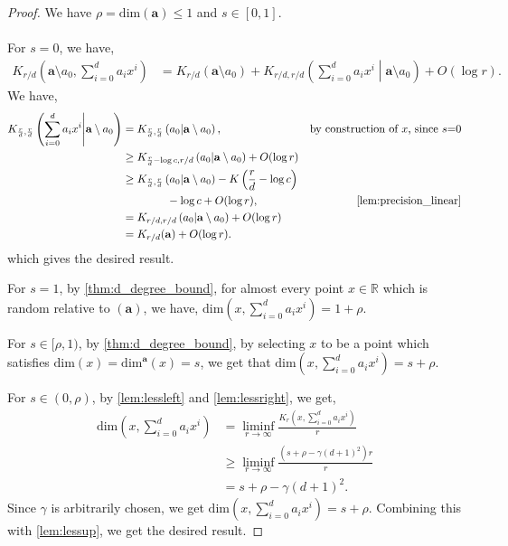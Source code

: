 \documentclass[a4paper,UKenglish,cleveref,autoref,thm-restate]{lipics-v2021}
\renewcommand{\dim}{{\mathrm{dim}}}
\begin{document}
\begin{proof}%
	We have $\rho=\dim(\mathbf{a})\leq1$ and $s\in[0,1]$. \\
	\\
	For $s=0$, we have, 
	\begin{align*}
		K_{r/d}\left(\mathbf{a}\setminus
          a_0,\sum_{i=0}^{d}a_ix^i\right)&=K_{r/d}\left(\mathbf{a}\setminus
                                           a_0\right)+K_{r/d,r/d}\left(\sum_{i=0}^{d}a_ix^i\middle|\mathbf{a}\setminus
                                           a_0\right)+O(\log r).
        \end{align*}
        We have,
        \begin{align*}
          K_{\frac{r}{d},\frac{r}{d}}\left(\sum_{i=0}^d a_i x^i
          \middle| \mathbf{a} \setminus a_0\right)
          &=
          K_{\frac{r}{d},\frac{r}{d}}\left(a_0 \middle|
          \mathbf{a}\setminus a_0\right),&\text{by construction of $x$, since $s$=0}\\
          &\geq
            K_{\frac{r}{d}-\log c,r/d}\left(a_0\middle|\mathbf{a}\setminus a_0\right)+O(\log r)\\%
          &\geq
            K_{\frac{r}{d},\frac{r}{d}}\left(a_0\middle|\mathbf{a}\setminus
            a_0\right)-K\left(\frac{r}{d}-\log c\right)\\
          &\quad\quad\quad\quad-\log c+O(\log
            r),&\cref{lem:precision_linear}\\ 
		&=K_{r/d,r/d}\left(a_0|\mathbf{a}\setminus a_0\right)+O(\log r)\\
		&=K_{r/d}(\mathbf{a})+O(\log r).
	\end{align*}
	which gives the desired result. 

For $s=1$, by \cref{thm:d_degree_bound}, for almost every point $x\in\mathbb{R}$ which is random relative to $(\mathbf{a})$, we have, $\dim\left(x,\sum_{i=0}^{d}a_ix^i\right)=1+\rho$. 

For $s\in[\rho,1)$, by \cref{thm:d_degree_bound}, by selecting $x$ to
be a point which satisfies $\dim(x)=\dim^{\mathbf{a}}(x)=s$, we get
that $\dim(x,\sum_{i=0}^d a_ix^i)=s+\rho$.

For $s\in(0,\rho)$, by \cref{lem:lessleft} and \cref{lem:lessright}, we
get,
	\begin{align*}
		\dim\left(x,\sum_{i=0}^{d}a_ix^i\right)&=\liminf_{r\rightarrow\infty}\frac{K_r\left(x,\sum_{i=0}^{d}a_ix^i\right)}{r}\\
		&\geq\liminf_{r\rightarrow\infty}\frac{\left(s+\rho-\gamma(d+1)^2\right)r}{r}\\
		&=s+\rho-\gamma(d+1)^2.
	\end{align*}
	Since $\gamma$ is arbitrarily chosen, we get
        $\dim\left(x,\sum_{i=0}^da_ix^i\right)=s+\rho$. Combining this
        with \cref{lem:lessup}, we get the desired result.
\end{proof}
\end{document}

